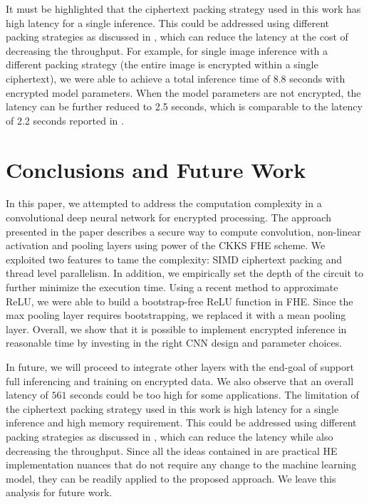 \documentclass[letterpaper]{article} %
\begin{document}
It must be highlighted that the ciphertext packing strategy used in this work has high latency for a single inference. This could be addressed using different packing strategies as discussed in \cite{brutzkus2019low}, which can reduce the latency at the cost of decreasing the throughput. For example, for single image inference with a different packing strategy (the entire image is encrypted within a single ciphertext), we were able to achieve a total inference time of 8.8 seconds with encrypted model parameters. When the model parameters are not encrypted, the latency can be further reduced to 2.5 seconds, which is comparable to the latency of 2.2 seconds reported in \cite{brutzkus2019low}.

\section{Conclusions and Future Work}
\label{sec:conclusion}
In this paper, we attempted to address the computation complexity in a convolutional deep neural network for encrypted processing. The approach presented in the paper describes a secure way to compute convolution, non-linear activation and pooling layers using power of the CKKS FHE scheme. We exploited two features to tame the complexity: SIMD ciphertext packing and thread level parallelism. In addition, we empirically set the depth of the circuit to further minimize the execution time. Using a recent method to approximate ReLU, we were able to build a bootstrap-free ReLU function in FHE. Since the max pooling layer requires bootstrapping, we replaced it with a mean pooling layer. Overall, we show that it is possible to implement encrypted inference in reasonable time by investing in the right CNN design and parameter choices.

In future, we will proceed to integrate other layers with the end-goal of support full inferencing and training on encrypted data. We also observe that an overall latency of $561$ seconds could be too high for some applications. The limitation of the ciphertext packing strategy used in this work is high latency for a single inference and high memory requirement. This could be addressed using different packing strategies as discussed in \cite{brutzkus2019low}, which can reduce the latency while also decreasing the throughput. Since all the ideas contained in \cite{brutzkus2019low} are practical HE implementation nuances that do not require any change to the machine learning model, they can be readily applied to the proposed approach. We leave this analysis for future work.
\end{document}
